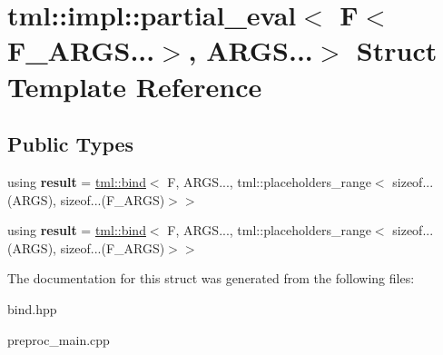 \hypertarget{structtml_1_1impl_1_1partial__eval_3_01F_3_01F__ARGS_8_8_8_4_00_01ARGS_8_8_8_4}{\section{tml\+:\+:impl\+:\+:partial\+\_\+eval$<$ F$<$ F\+\_\+\+A\+R\+G\+S...$>$, A\+R\+G\+S...$>$ Struct Template Reference}
\label{structtml_1_1impl_1_1partial__eval_3_01F_3_01F__ARGS_8_8_8_4_00_01ARGS_8_8_8_4}
}
\subsection*{Public Types}
\begin{DoxyCompactItemize}
\item 
\hypertarget{structtml_1_1impl_1_1partial__eval_3_01F_3_01F__ARGS_8_8_8_4_00_01ARGS_8_8_8_4_a68d9d7e72cb4003cda25900ba520d10d}{using {\bfseries result} = \hyperlink{structtml_1_1bind}{tml\+::bind}$<$ F, A\+R\+G\+S..., tml\+::placeholders\+\_\+range$<$ sizeof...(A\+R\+G\+S), sizeof...(F\+\_\+\+A\+R\+G\+S)$>$$>$}\label{structtml_1_1impl_1_1partial__eval_3_01F_3_01F__ARGS_8_8_8_4_00_01ARGS_8_8_8_4_a68d9d7e72cb4003cda25900ba520d10d}

\item 
\hypertarget{structtml_1_1impl_1_1partial__eval_3_01F_3_01F__ARGS_8_8_8_4_00_01ARGS_8_8_8_4_a68d9d7e72cb4003cda25900ba520d10d}{using {\bfseries result} = \hyperlink{structtml_1_1bind}{tml\+::bind}$<$ F, A\+R\+G\+S..., tml\+::placeholders\+\_\+range$<$ sizeof...(A\+R\+G\+S), sizeof...(F\+\_\+\+A\+R\+G\+S)$>$$>$}\label{structtml_1_1impl_1_1partial__eval_3_01F_3_01F__ARGS_8_8_8_4_00_01ARGS_8_8_8_4_a68d9d7e72cb4003cda25900ba520d10d}

\end{DoxyCompactItemize}


The documentation for this struct was generated from the following files\+:\begin{DoxyCompactItemize}
\item 
bind.\+hpp\item 
preproc\+\_\+main.\+cpp\end{DoxyCompactItemize}
